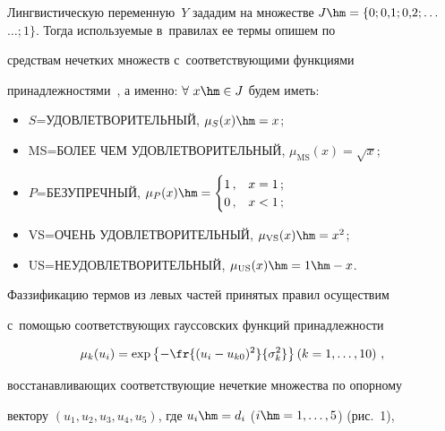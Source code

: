   

  Лингвистическую переменную~$Y$ зададим на множестве $J\hm=\{0; 0{,}1;0{,}2; \ldots$\linebreak $\ldots ; 1\}$. Тогда используемые в~правилах ее термы опишем по 

средствам нечетких множеств с~соответствующими функциями 

принадлежностями~\cite{7-rz}, а именно: $\forall\ x\hm\in J$ будем иметь: 

  \begin{itemize}

\item $S$\;=\;УДОВЛЕТВОРИТЕЛЬНЫЙ, $\mu_S(x)\hm=x$; 

\item MS\;=\;БОЛЕЕ ЧЕМ УДОВЛЕТВОРИТЕЛЬНЫЙ, $\mu_{\mathrm{MS}}(x)=\sqrt{x}$; 

\item $P$\;=\;БЕЗУПРЕЧНЫЙ, $\mu_P(x)\hm=\begin{cases}

1\,, & x=1\,;\\

0\,, & x<1\,;

\end{cases}$

\item VS\;=\;ОЧЕНЬ УДОВЛЕТВОРИТЕЛЬНЫЙ, $\mu_{\mathrm{VS}}(x)\hm=x^2$; 

\item US\;=\;НЕУДОВЛЕТВОРИТЕЛЬНЫЙ, $\mu_{\mathrm{US}}(x)\hm=1\hm-x$. 

  \end{itemize}

  

  Фаззификацию термов из левых частей принятых правил осуществим 

с~помощью соответствующих гауссовских функций принадлежности 

  \begin{equation}

  \mu_k(u_i) =\exp \left\{ -\fr{(u_i-u_{k0})^2}{\sigma_k^2}\right\} \left( k=1, \ldots , 

10\right)\,,

  \label{e1-rz}

  \end{equation}

восстанавливающих соответствующие нечеткие множества по опорному 

вектору $(u_1, u_2, u_3, u_4, u_5)$, где $u_i\hm=d_i$ ($i \hm=1, \ldots , 5$) (рис.~1), 

